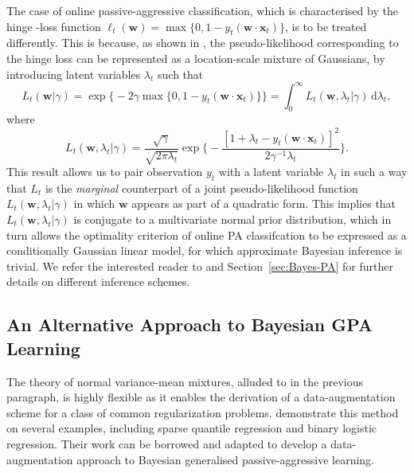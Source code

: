 The case of online passive-aggressive classification, which is characterised by the hinge	-loss function $\ell_t(\mathbf{w}) = \max\{0, 1 - y_t(\mathbf{w}\cdot\mathbf{x}_t)\}$, is to be treated differently. This is because, as shown in \citep[Theorem~1]{polson&scott}, the pseudo-likelihood corresponding to the hinge loss can be represented as a location-scale mixture of Gaussians, by introducing latent variables $\lambda_t$ such that
\begin{equation}
	L_{t}(\mathbf{w}|\gamma)
	= \exp\Big\{-2\gamma\max\big\{0, 1 - y_t(\mathbf{w}\cdot\mathbf{x}_t)\big\}\Big\}
	= \int_{0}^{\infty} L_{t}(\mathbf{w}, \lambda_t|\gamma)\,\mathrm{d}\lambda_t,
\end{equation}
where
\begin{equation}
	L_{t}(\mathbf{w}, \lambda_t|\gamma)
	= \frac{\sqrt{\gamma}}{\sqrt{2\pi\lambda_t}}\exp\Big\{-\frac{[1+\lambda_t-y_t(\mathbf{w}\cdot\mathbf{x}_t)]^2}{2\gamma^{-1}\lambda_t}\Big\}.
\end{equation}
This result allows us to pair observation $y_t$ with a latent variable $\lambda_t$ in such a way that $L_t$ is the \emph{marginal} counterpart of a joint pseudo-likelihood function $L_{t}(\mathbf{w}, \lambda_t|\gamma)$ in which $\mathbf{w}$ appears as part of a quadratic form. This implies that $ L_{t}(\mathbf{w}, \lambda_t|\gamma)$ is conjugate to a multivariate normal prior distribution, which in turn allows the optimality criterion of online PA classifcation to be expressed as a conditionally Gaussian linear model, for which approximate Bayesian inference is trivial. We refer the interested reader to \citep{polson&scott} and Section~\ref{sec:Bayes-PA} for further details on different inference schemes.

\subsection{An Alternative Approach to Bayesian GPA Learning}

The theory of normal variance-mean mixtures, alluded to in the previous paragraph, is highly flexible as it enables the derivation of a data-augmentation scheme for a class of common regularization problems. \citet{polson&scott13} demonstrate this method on several examples, including sparse quantile regression and binary logistic regression. Their work can be borrowed and adapted to develop a data-augmentation approach to Bayesian generalised passive-aggressive learning.
 



